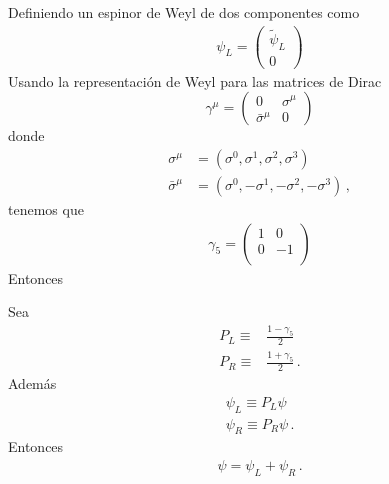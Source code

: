 Definiendo un espinor de  Weyl de dos componentes como
\begin{align*}
  \psi_L=  \begin{pmatrix}
    \widetilde{\psi}_L\\
    0 
  \end{pmatrix}
\end{align*}
Usando la representación de Weyl para las matrices de Dirac
\begin{equation}
  \gamma^\mu=\begin{pmatrix}
    0&\sigma^\mu\\
    \bar{\sigma}^\mu & 0
  \end{pmatrix}
\end{equation}
donde
\begin{align}
  \sigma^\mu&=(\sigma^0,\sigma^1,\sigma^2,\sigma^3)\nonumber\\
  \bar{\sigma}^\mu&=(\sigma^0,-\sigma^1,-\sigma^2,-\sigma^3)\,,
\end{align}
tenemos que
\begin{align*}
  \gamma_5=
  \begin{pmatrix}
    1 &0\\
    0&-1\\
  \end{pmatrix}
\end{align*}
Entonces

Sea
\begin{align}
  P_L\equiv&\frac{1-\gamma_5}{2}\nonumber\\
  P_R\equiv&\frac{1+\gamma_5}{2}\,.
\end{align}
Además
\begin{align}
  \psi_L\equiv P_L\psi\nonumber\\
  \psi_R\equiv P_R\psi\,.
\end{align}
Entonces
\begin{align}
  \psi=\psi_L+\psi_R\,.
\end{align}


